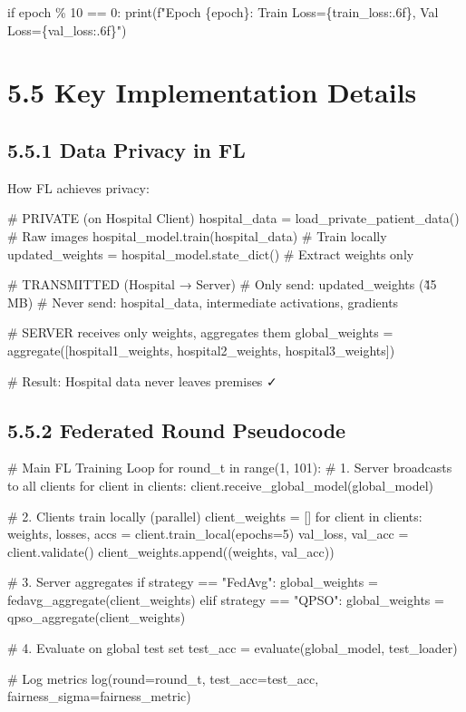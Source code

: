         if epoch \% 10 == 0:
            print(f"Epoch \{epoch\}: Train Loss=\{train\_loss:.6f\}, Val Loss=\{val\_loss:.6f\}")


\section{5.5 Key Implementation Details}

\subsection{5.5.1 Data Privacy in FL}
How FL achieves privacy:

\# PRIVATE (on Hospital Client)
hospital\_data = load\_private\_patient\_data()  \# Raw images
hospital\_model.train(hospital\_data)  \# Train locally
updated\_weights = hospital\_model.state\_dict()  \# Extract weights only

\# TRANSMITTED (Hospital → Server)
\# Only send: updated\_weights  (\~45 MB)
\# Never send: hospital\_data, intermediate activations, gradients

\# SERVER receives only weights, aggregates them
global\_weights = aggregate([hospital1\_weights, hospital2\_weights, hospital3\_weights])

\# Result: Hospital data never leaves premises ✓


\subsection{5.5.2 Federated Round Pseudocode}
\# Main FL Training Loop
for round\_t in range(1, 101):
    \# 1. Server broadcasts to all clients
    for client in clients:
        client.receive\_global\_model(global\_model)
    
    \# 2. Clients train locally (parallel)
    client\_weights = []
    for client in clients:
        weights, losses, accs = client.train\_local(epochs=5)
        val\_loss, val\_acc = client.validate()
        client\_weights.append((weights, val\_acc))
    
    \# 3. Server aggregates
    if strategy == "FedAvg":
        global\_weights = fedavg\_aggregate(client\_weights)
    elif strategy == "QPSO":
        global\_weights = qpso\_aggregate(client\_weights)
    
    \# 4. Evaluate on global test set
    test\_acc = evaluate(global\_model, test\_loader)
    
    \# Log metrics
    log(round=round\_t, test\_acc=test\_acc, fairness\_sigma=fairness\_metric)


